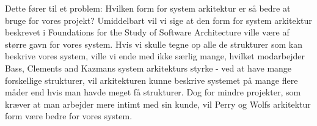 \documentclass[10pt,a4paper,danish]{article}
\begin{document}
Dette fører til et problem: Hvilken form for system arkitektur er så bedre at bruge for vores projekt? Umiddelbart vil vi sige at den form for system arkitektur beskrevet i Foundations for the Study of Software Architecture ville være af større gavn for vores system. Hvis vi skulle tegne op alle de strukturer som kan beskrive vores system, ville vi ende med ikke særlig mange, hvilket modarbejder Bass, Clements and Kazmans system arkitekturs styrke - ved at have mange forskellige strukturer, vil arkitekturen kunne beskrive systemet på mange flere måder end hvis man havde meget få strukturer. Dog for mindre projekter, som kræver at man arbejder mere intimt med sin kunde, vil Perry og Wolfs arkitektur form være bedre for vores system. 
\end{document}
